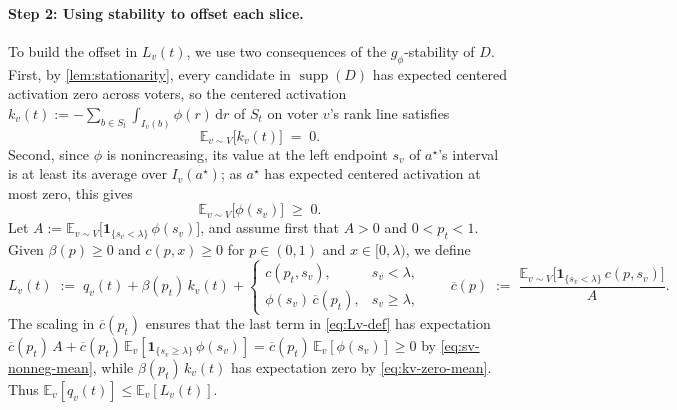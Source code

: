 \documentclass[11pt]{article}
\numberwithin{equation}{section}
\theoremstyle{plain}
\theoremstyle{definition}
\newcommand{\E}{\mathbb{E}}
\newcommand{\1}{\mathbf{1}}
\newcommand{\supp}{\operatorname{supp}}
\begin{document}
\paragraph{Step 2: Using stability to offset each slice.}
To build the offset in $L_v(t)$, we use two consequences of the $g_\phi$-stability of $D$. First, by \cref{lem:stationarity}, every candidate in $\supp(D)$ has expected centered activation zero across voters, so the centered activation $k_v(t) := -\sum_{b \in S_t} \int_{I_v(b)} \phi(r)\,\mathrm{d}r$ of $S_t$ on voter $v$'s rank line satisfies
\begin{equation}
  \E_{v \sim V}\bigl[k_v(t)\bigr] \;=\; 0.
  \label{eq:kv-zero-mean}
\end{equation}
Second, since $\phi$ is nonincreasing, its value at the left endpoint $s_v$ of $a^\star$'s interval is at least its average over $I_v(a^\star)$; as $a^\star$ has expected centered activation at most zero, this gives
\begin{equation}
  \E_{v \sim V}\bigl[\phi(s_v)\bigr] \;\ge\; 0.
  \label{eq:sv-nonneg-mean}
\end{equation}
Let $A := \E_{v \sim V}\bigl[\1_{\{s_v < \lambda\}}\,\phi(s_v)\bigr]$, and assume first that $A > 0$ and $0 < p_t < 1$. Given $\beta(p) \ge 0$ and $c(p, x) \ge 0$ for $p \in (0, 1)$ and $x \in [0, \lambda)$, we define
\begin{equation}
  L_v(t) \;:=\; q_v(t) + \beta(p_t)\,k_v(t) +
  \begin{cases}
    c(p_t, s_v), & s_v < \lambda, \\
    \phi(s_v)\,\overline{c}(p_t), & s_v \ge \lambda,
  \end{cases}
  \qquad
  \overline{c}(p) \;:=\; \frac{\E_{v \sim V}\bigl[\1_{\{s_v < \lambda\}}\,c(p, s_v)\bigr]}{A}.
  \label{eq:Lv-def}
\end{equation}
The scaling in $\overline{c}(p_t)$ ensures that the last term in \cref{eq:Lv-def} has expectation $\overline{c}(p_t)\,A + \overline{c}(p_t)\,\E_v[\1_{\{s_v \ge \lambda\}}\,\phi(s_v)] = \overline{c}(p_t)\,\E_v[\phi(s_v)] \ge 0$ by \cref{eq:sv-nonneg-mean}, while $\beta(p_t)\,k_v(t)$ has expectation zero by \cref{eq:kv-zero-mean}. Thus $\E_v[q_v(t)] \le \E_v[L_v(t)]$.
\end{document}
